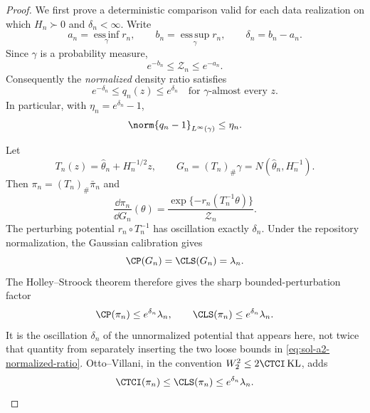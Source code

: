 \documentclass[../main.tex]{subfiles}
\begin{document}
\begin{proof}
We first prove a deterministic comparison valid for each data realization on which $H_n\succ0$
and $\delta_n<\infty$.  Write
\[
 a_n=\operatorname*{ess\,inf}_{\gamma}r_n,\qquad
 b_n=\operatorname*{ess\,sup}_{\gamma}r_n,
 \qquad \delta_n=b_n-a_n.
\]
Since $\gamma$ is a probability measure,
\[
 e^{-b_n}\le\mathcal Z_n\le e^{-a_n}.
\]
Consequently the \emph{normalized} density ratio satisfies
\begin{equation}
\label{eq:sol-a2-normalized-ratio}
 e^{-\delta_n}\le q_n(z)\le e^{\delta_n}
 \quad\text{for $\gamma$-almost every }z.
\end{equation}
In particular, with $\eta_n=e^{\delta_n}-1$,
\begin{equation}
\label{eq:sol-a2-ratio-to-one}
 \norm{q_n-1}_{L^\infty(\gamma)}\le\eta_n.
\end{equation}

Let
\[
 T_n(z)=\hat\theta_n+H_n^{-1/2}z,\qquad
 G_n=(T_n)_\#\gamma=N(\hat\theta_n,H_n^{-1}).
\]
Then $\pi_n=(T_n)_\#\bar\pi_n$ and
\[
 \frac{\dd\pi_n}{\dd G_n}(\theta)
 =\frac{\exp\{-r_n(T_n^{-1}\theta)\}}{\mathcal Z_n}.
\]
The perturbing potential $r_n\circ T_n^{-1}$ has oscillation exactly $\delta_n$.
Under the repository normalization, the Gaussian calibration gives
\[
 \CP(G_n)=\CLS(G_n)=\lambda_n.
\]
The Holley--Stroock theorem therefore gives the sharp bounded-perturbation factor
\begin{equation}
\label{eq:sol-a2-hs-upper}
 \CP(\pi_n)\le e^{\delta_n}\lambda_n,\qquad
 \CLS(\pi_n)\le e^{\delta_n}\lambda_n.
\end{equation}
It is the oscillation $\delta_n$ of the unnormalized potential that appears here, not twice that
quantity from separately inserting the two loose bounds in
\eqref{eq:sol-a2-normalized-ratio}.  Otto--Villani, in the convention
$W_2^2\le2\CTCI\operatorname{KL}$, adds
\begin{equation}
\label{eq:sol-a2-tci-upper}
 \CTCI(\pi_n)\le\CLS(\pi_n)\le e^{\delta_n}\lambda_n.
\end{equation}


\end{proof}
\end{document}
